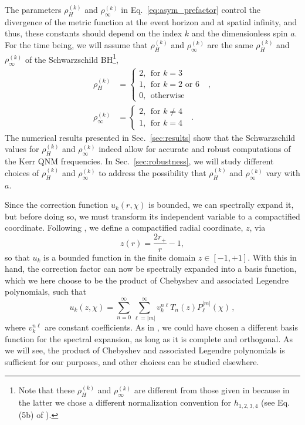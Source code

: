 \documentclass[aps,prx,amsmath,floats,floatfix,twocolumn,
  superscriptaddress,nofootinbib,showpacs]{revtex4-1}
\begin{document}
The parameters $\rho_{H}^{(k)}$ and $\rho_{\infty}^{(k)}$ in Eq.~\eqref{eq:asym_prefactor} control the divergence of the metric function at the event horizon and at spatial infinity, and thus, these constants should depend on the index $k$ and the dimensionless spin $a$. 
For the time being, we will assume that $\rho_{H}^{(k)}$ and $\rho_{\infty}^{(k)}$ are the same $\rho_{H}^{(k)}$ and $\rho_{\infty}^{(k)}$ of the Schwarzschild BH\footnote{Note that these $\rho_{H}^{(k)}$ and $\rho_{\infty}^{(k)}$ are different from those given in \cite{Chung:2023zdq} because in the latter we chose a different normalization convention for $h_{1, 2, 3, 4}$ (see Eq. (5b) of \cite{Chung:2023zdq}).}, 
\begin{equation}\label{eq:rhos}
\begin{split}
\rho_H^{(k)} & = 
\begin{cases}
2, ~~ \text{for $k = 3$ }\\
1, ~~ \text{for $k = 2\text{  or  } 6$ }\\
0, ~~ \text{otherwise}
\end{cases}, \\
\rho_{\infty}^{(k)} & = 
\begin{cases}
2, ~~ \text{for $k \neq 4$ }\\
1, ~~ \text{for $k = 4$}
\end{cases}.
\end{split} 
\end{equation}
The numerical results presented in Sec.~\ref{sec:results} show that the Schwarzschild values for $\rho_{H}^{(k)}$ and $\rho_{\infty}^{(k)}$ indeed allow for accurate and robust computations of the Kerr QNM frequencies. 
In Sec.~\ref{sec:robustness}, we will study different choices of $\rho_{H}^{(k)}$ and $\rho_{\infty}^{(k)}$ to address the possibility that $\rho_{H}^{(k)}$ and $\rho_{\infty}^{(k)}$ vary with $a$. 

Since the correction function $u_k(r, \chi)$ is bounded, we can spectrally expand it, but before doing so, we must transform its independent variable to a compactified coordinate.
Following \cite{Chung:2023zdq}, we define a compactified radial coordinate, $z$, via \cite{Langlois:2021xzq, Jansen:2017oag}
\begin{equation}\label{eq:z}
z(r) = \frac{2r_+}{r} - 1, 
\end{equation}
so that $u_k$ is a bounded function in the finite domain $z \in [-1, +1] $. With this in hand, the correction factor can now be spectrally expanded into a basis function, which we here choose to be the product of Chebyshev and associated Legendre polynomials, such that 
\begin{equation}
\label{eq:spectral_decoposition_correction_factor}
u_k (z, \chi) = \sum_{n=0}^{\infty} \sum_{\ell=|m|}^{\infty} v_k^{n \ell}  T_{n}(z) P^{|m|}_{\ell}(\chi)\,,
\end{equation}
where $ v_k^{n \ell}$ are constant coefficients.
As in \cite{Chung:2023zdq}, we could have chosen a different basis function for the spectral expansion, as long as it is complete and orthogonal. 
As we will see, the product of Chebyshev and associated Legendre polynomials is sufficient for our purposes, and other choices can be studied elsewhere.  
\end{document}
